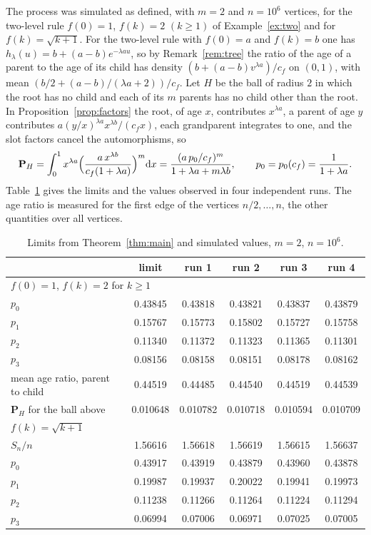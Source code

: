 \documentclass[11pt]{amsart}
\theoremstyle{definition}
\begin{document}
The process was simulated as defined, with $m=2$ and $n=10^6$ vertices, for the two-level rule $f(0)=1$,
$f(k)=2$ $(k\ge1)$ of Example~\ref{ex:two} and for $f(k)=\sqrt{k+1}$. For the two-level rule with $f(0)=a$ and
$f(k)=b$ one has $h_\lambda(u)=b+(a-b)e^{-\lambda au}$, so by Remark~\ref{rem:tree} the ratio of the age of a
parent to the age of its child has density $(b+(a-b)v^{\lambda a})/c_f$ on $(0,1)$, with mean
$(b/2+(a-b)/(\lambda a+2))/c_f$. Let $H$ be the ball of radius $2$ in which the root has no child and each of its
$m$ parents has no child other than the root. In Proposition~\ref{prop:factors} the root, of age $x$, contributes
$x^{\lambda a}$, a parent of age $y$ contributes $a(y/x)^{\lambda a}x^{\lambda b}/(c_fx)$, each grandparent
integrates to one, and the slot factors cancel the automorphisms, so
\[
   \mathbf P_H=\int_0^1x^{\lambda a}\Bigl(\frac{a\,x^{\lambda b}}{c_f(1+\lambda a)}\Bigr)^m\mathrm dx
      =\frac{(a\,p_0/c_f)^m}{1+\lambda a+m\lambda b},\qquad p_0=p_0(c_f)=\frac1{1+\lambda a}.
\]
Table~\ref{tab:sim} gives the limits and the values observed in four independent runs. The age ratio is measured
for the first edge of the vertices $n/2,\dots,n$, the other quantities over all vertices.

\begin{table}[h]
\centering
\begin{tabular}{lccccc}
\toprule
 & limit & run 1 & run 2 & run 3 & run 4\\
\midrule
\multicolumn{6}{l}{$f(0)=1$, $f(k)=2$ for $k\ge1$}\\
$p_0$ & 0.43845 & 0.43818 & 0.43821 & 0.43837 & 0.43879\\
$p_1$ & 0.15767 & 0.15773 & 0.15802 & 0.15727 & 0.15758\\
$p_2$ & 0.11340 & 0.11372 & 0.11323 & 0.11365 & 0.11301\\
$p_3$ & 0.08156 & 0.08158 & 0.08151 & 0.08178 & 0.08162\\
mean age ratio, parent to child & 0.44519 & 0.44485 & 0.44540 & 0.44519 & 0.44539\\
$\mathbf P_H$ for the ball above & 0.010648 & 0.010782 & 0.010718 & 0.010594 & 0.010709\\
\midrule
\multicolumn{6}{l}{$f(k)=\sqrt{k+1}$}\\
$S_n/n$ & 1.56616 & 1.56618 & 1.56619 & 1.56615 & 1.56637\\
$p_0$ & 0.43917 & 0.43919 & 0.43879 & 0.43960 & 0.43878\\
$p_1$ & 0.19987 & 0.19937 & 0.20022 & 0.19941 & 0.19973\\
$p_2$ & 0.11238 & 0.11266 & 0.11264 & 0.11224 & 0.11294\\
$p_3$ & 0.06994 & 0.07006 & 0.06971 & 0.07025 & 0.07005\\
\bottomrule
\end{tabular}
\caption{Limits from Theorem~\ref{thm:main} and simulated values, $m=2$, $n=10^6$.}\label{tab:sim}
\end{table}
\end{document}
